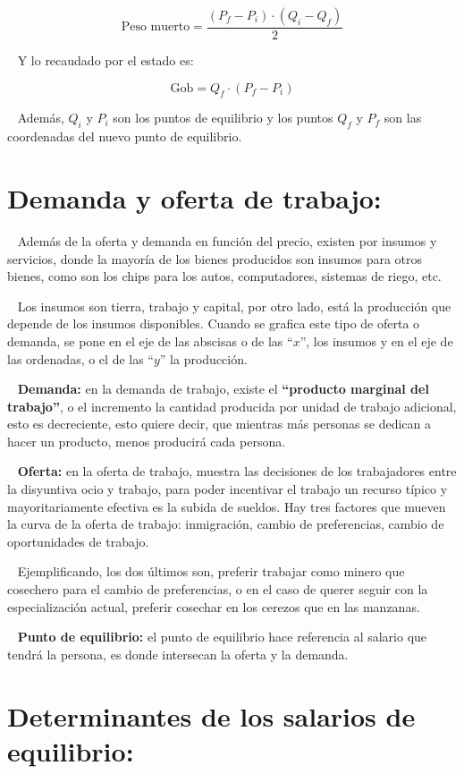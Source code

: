 \documentclass[
  letterpaper,
  DIV=11,
  numbers=noendperiod]{scrreport}
\begin{document}
\[
\text{Peso muerto}=\frac{(P_f-P_i)\cdot (Q_i-Q_f)}{2}
\]

~ Y lo recaudado por el estado es:

\[
\text{Gob}=Q_f\cdot (P_f-P_i)
\]

~ Además, \(Q_i\) y \(P_i\) son los puntos de equilibrio y los puntos
\(Q_f\) y \(P_f\) son las coordenadas del nuevo punto de equilibrio.

\hypertarget{demanda-y-oferta-de-trabajo}{%
\section{Demanda y oferta de
trabajo:}\label{demanda-y-oferta-de-trabajo}}

~ Además de la oferta y demanda en función del precio, existen por
insumos y servicios, donde la mayoría de los bienes producidos son
insumos para otros bienes, como son los chips para los autos,
computadores, sistemas de riego, etc.

~ Los insumos son tierra, trabajo y capital, por otro lado, está la
producción que depende de los insumos disponibles. Cuando se grafica
este tipo de oferta o demanda, se pone en el eje de las abscisas o de
las ``\(x\)'', los insumos y en el eje de las ordenadas, o el de las
``\(y\)'' la producción.

~ \textbf{Demanda:} en la demanda de trabajo, existe el
\textbf{``producto marginal del trabajo''}, o el incremento la cantidad
producida por unidad de trabajo adicional, esto es decreciente, esto
quiere decir, que mientras más personas se dedican a hacer un producto,
menos producirá cada persona.

~ \textbf{Oferta:} en la oferta de trabajo, muestra las decisiones de
los trabajadores entre la disyuntiva ocio y trabajo, para poder
incentivar el trabajo un recurso típico y mayoritariamente efectiva es
la subida de sueldos. Hay tres factores que mueven la curva de la oferta
de trabajo: inmigración, cambio de preferencias, cambio de oportunidades
de trabajo.

~ Ejemplificando, los dos últimos son, preferir trabajar como minero que
cosechero para el cambio de preferencias, o en el caso de querer seguir
con la especialización actual, preferir cosechar en los cerezos que en
las manzanas.

~ \textbf{Punto de equilibrio:} el punto de equilibrio hace referencia
al salario que tendrá la persona, es donde intersecan la oferta y la
demanda.

\hypertarget{determinantes-de-los-salarios-de-equilibrio}{%
\section{Determinantes de los salarios de
equilibrio:}\label{determinantes-de-los-salarios-de-equilibrio}}
\end{document}
